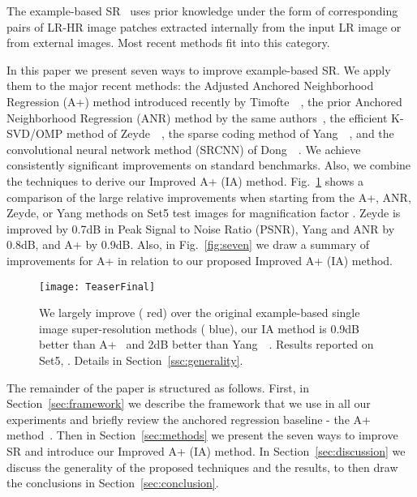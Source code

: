\documentclass[10pt,twocolumn,letterpaper]{article}
\begin{document}
The example-based SR~\cite{Freeman-CGA-2002} uses prior knowledge under the form of corresponding pairs of LR-HR image patches extracted internally from the input LR image or from external images. Most recent methods fit into this category. 

In this paper we present seven ways to improve example-based SR.
We apply them to the major recent methods: the Adjusted Anchored Neighborhood Regression (A+) method introduced recently by Timofte~\etal~\cite{Timofte-ACCV-2014}, the prior Anchored Neighborhood Regression (ANR) method by the same authors~\cite{Timofte-ICCV-2013}, the efficient K-SVD/OMP method of Zeyde~\etal~\cite{Zeyde-CS-2012}, the sparse coding method of Yang~\etal~\cite{Yang-CVPR-2008}, and the convolutional neural network method (SRCNN) of Dong~\etal~\cite{Dong-ECCV-2014}. We achieve consistently significant improvements on standard benchmarks. 
Also, we combine the techniques to derive our Improved A+ (IA) method.
Fig.~\ref{fig:teaser} shows a comparison of the large relative improvements when starting from the A+, ANR, Zeyde, or Yang methods on Set5 test images for magnification factor . Zeyde is improved by 0.7dB in Peak Signal to Noise Ratio (PSNR), Yang and ANR by 0.8dB, and A+ by 0.9dB. Also, in Fig.~\ref{fig:seven} we draw a summary of improvements for A+ in relation to our proposed Improved A+ (IA) method.
\begin{figure}[t!]
\texttt{[image: TeaserFinal]}
\caption{We largely improve ({\color{red} red}) over the original example-based single image super-resolution methods ({\color{blue} blue}), \ie our IA method is 0.9dB better than A+~\cite{Timofte-ACCV-2014} and 2dB better than Yang~\etal~\cite{Yang-CVPR-2008}. Results reported on Set5, . Details in Section~\ref{ssc:generality}.} 
\label{fig:teaser}
\vspace{-0.5cm}
\end{figure}

The remainder of the paper is structured as follows.
First, in Section~\ref{sec:framework} we describe the framework that we use in all our experiments and briefly review the anchored regression baseline - the A+ method~\cite{Timofte-ACCV-2014}. Then in Section~\ref{sec:methods} we present the seven ways to improve SR and introduce our Improved A+ (IA) method. In Section~\ref{sec:discussion} we discuss the generality of the proposed techniques and the results, to then draw the conclusions in Section~\ref{sec:conclusion}.
\end{document}
